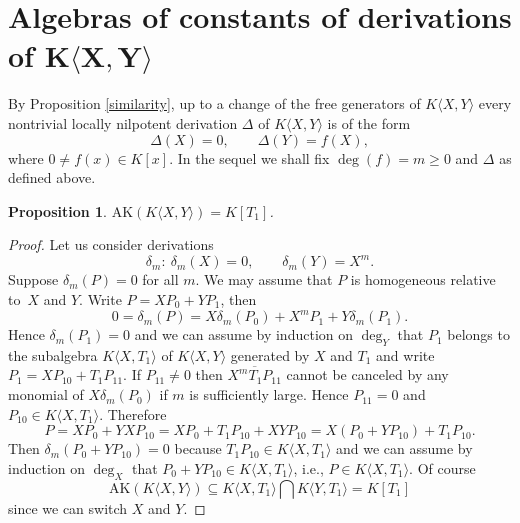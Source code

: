 \documentclass[pdftex]{sigma}
\numberwithin{equation}{section}
\newtheorem{Proposition}[Theorem]{Proposition}
\begin{document}
\section[Algebras of constants of derivations of $K\langle X,Y\rangle$]{Algebras of constants of derivations of $\boldsymbol{K\langle X,Y\rangle}$}

By Proposition \ref{similarity}, up to a change of the free generators of $K\langle X,Y\rangle$ every nontrivial locally nilpotent derivation $\Delta$ of $K\langle X,Y\rangle$ is of the form
\[
\Delta(X)=0,\qquad \Delta(Y)=f(X),
\]
where $0\not=f(x)\in K[x]$. In the sequel we shall fix $\deg(f)=m\geq 0$ and $\Delta$ as defined above.

\begin{Proposition}\label{AK is generated by commutator}
$\text{AK}(K\langle X,Y\rangle) = K[T_1]$.
\end{Proposition}
\begin{proof}
Let us consider derivations
\[
\delta_m\colon \ \delta_m(X) = 0, \qquad\delta_m(Y) = X^m.
\]
Suppose $\delta_m(P) = 0$ for all $m$. We may assume that $P$ is homogeneous relative to~$X$ and $Y$. Write $P = XP_0 + YP_1$, then
\[
0 = \delta_m(P) = X\delta_m(P_0) + X^mP_1+ Y\delta_m(P_1).
\]
Hence $\delta_m(P_1) = 0$ and we can assume by induction on $\deg_Y$ that $P_1$ belongs to the subalgebra $K\langle X, T_1\rangle$ of $K\langle X,Y\rangle$ generated by $X$ and $T_1$ and write $P_1 = XP_{10} + T_1P_{11}$. If $P_{11} \neq 0$ then $\overline{X^mT_1P_{11}}$ cannot be canceled by any monomial of $X\delta_m(P_0)$ if $m$ is sufficiently large. Hence $P_{11} = 0$ and $P_{10} \in K\langle X, T_1\rangle$. Therefore
\[
P = XP_0 + YXP_{10} =XP_0 + T_1P_{10} + XYP_{10} = X(P_0 + YP_{10}) + T_1P_{10}.
\]
Then $\delta_m(P_0 +YP_{10}) = 0$ because $T_1P_{10} \in K\langle X,T_1\rangle$ and we can assume by induction on $\deg_X$ that $P_0 + YP_{10} \in K\langle X, T_1\rangle$, i.e., $P \in K\langle X, T_1\rangle$. Of course
\[
\text{AK}(K\langle X,Y\rangle) \subseteq K\langle X, T_1\rangle\bigcap K\langle Y, T_1\rangle= K[T_1]
\]
since we can switch $X$ and $Y$.
\end{proof}
\end{document}
